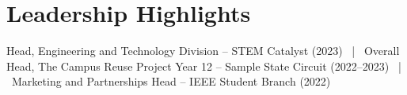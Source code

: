 \documentclass[10pt,a4paper]{article}
\begin{document}
\section*{Leadership Highlights}
Head, Engineering and Technology Division -- STEM Catalyst (2023) \, | \, Overall Head, The Campus Reuse Project Year 12 -- Sample State Circuit (2022--2023) \, | \, Marketing and Partnerships Head -- IEEE Student Branch (2022)
\end{document}
